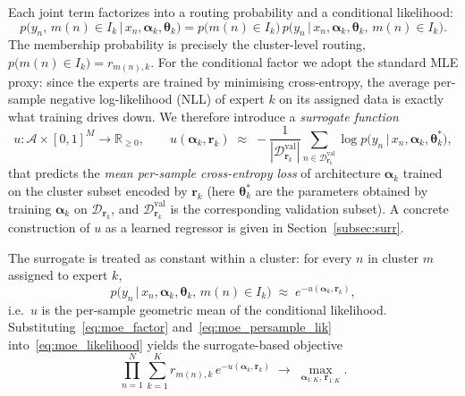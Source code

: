 Each joint term factorizes into a routing probability and a conditional likelihood:
\begin{equation}
\label{eq:moe_factor}
p\bigl(y_n,\, m(n) \in I_k \,\big|\, x_n, \boldsymbol{\alpha}_k, \boldsymbol{\theta}_k\bigr)
= p\bigl(m(n) \in I_k\bigr)\, p\bigl(y_n \,\big|\, x_n, \boldsymbol{\alpha}_k, \boldsymbol{\theta}_k,\, m(n) \in I_k\bigr).
\end{equation}
The membership probability is precisely the cluster-level routing,
$p\bigl(m(n) \in I_k\bigr) = r_{m(n), k}$. For the conditional factor we adopt the standard MLE proxy: since the experts are trained by minimising cross-entropy, the average per-sample negative log-likelihood (NLL) of expert $k$ on its assigned data is exactly what training drives down. We therefore introduce a \emph{surrogate function}
\begin{equation}
\label{eq:surrogate_def}
u: \mathcal{A} \times [0,1]^M \to \mathbb{R}_{\geq 0},
\qquad u(\boldsymbol{\alpha}_k, \mathbf{r}_k)
\;\approx\;
- \frac{1}{|\mathcal{D}_{\mathbf{r}_k}^{\text{val}}|}\!\!
\sum_{n \in \mathcal{D}_{\mathbf{r}_k}^{\text{val}}}
\!\!\log p\bigl(y_n \,\big|\, x_n, \boldsymbol{\alpha}_k, \boldsymbol{\theta}_k^{*}\bigr),
\end{equation}
that predicts the \emph{mean per-sample cross-entropy loss} of architecture $\boldsymbol{\alpha}_k$ trained on the cluster subset encoded by $\mathbf{r}_k$ (here $\boldsymbol{\theta}_k^{*}$ are the parameters obtained by training $\boldsymbol{\alpha}_k$ on $\mathcal{D}_{\mathbf{r}_k}$, and $\mathcal{D}_{\mathbf{r}_k}^{\text{val}}$ is the corresponding validation subset). A concrete construction of $u$ as a learned regressor is given in Section~\ref{subsec:surr}.

The surrogate is treated as constant within a cluster: for every $n$ in cluster $m$ assigned to expert $k$,
\begin{equation}
\label{eq:moe_persample_lik}
p\bigl(y_n \,\big|\, x_n, \boldsymbol{\alpha}_k, \boldsymbol{\theta}_k,\, m(n) \in I_k\bigr)
\;\approx\; e^{-u(\boldsymbol{\alpha}_k, \mathbf{r}_k)},
\end{equation}
i.e.\ $u$ is the per-sample geometric mean of the conditional likelihood. Substituting~\eqref{eq:moe_factor} and~\eqref{eq:moe_persample_lik} into~\eqref{eq:moe_likelihood} yields the surrogate-based objective
\begin{equation}
\label{eq:moe_surr_likelihood}
\prod_{n=1}^{N} \sum_{k=1}^{K} r_{m(n), k}\, e^{-u(\boldsymbol{\alpha}_k, \mathbf{r}_k)}
\;\to\; \max_{\boldsymbol{\alpha}_{1:K},\, \mathbf{r}_{1:K}}.
\end{equation}

